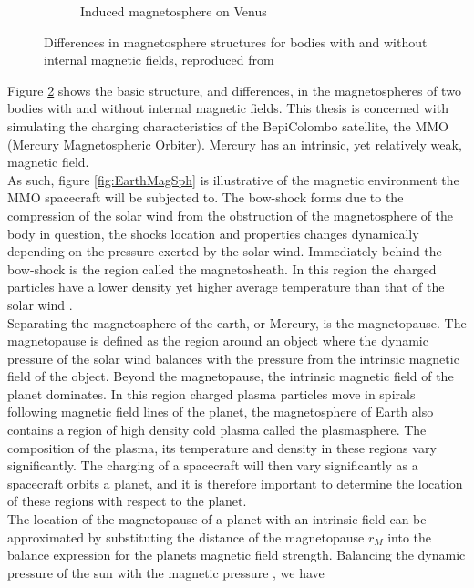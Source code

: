 \begin{figure}
\begin{subfigure}{.5\textwidth}
    \caption{Induced magnetosphere on Venus}
    \label{fig:VenusMagSph}
\end{subfigure}
\caption{Differences in magnetosphere structures for bodies with and without internal magnetic fields, reproduced from }
\label{fig:magnetosphere}
\end{figure}

Figure \ref{fig:magnetosphere} shows the basic structure, and differences, in the magnetospheres of two bodies with and without internal magnetic fields. This thesis is concerned with simulating the charging characteristics of the BepiColombo satellite, the MMO (Mercury Magnetospheric Orbiter). Mercury has an intrinsic, yet relatively weak, magnetic field. 
\\
As such, figure \ref{fig:EarthMagSph} is illustrative of the magnetic environment the MMO spacecraft will be subjected to. The bow-shock forms due to the compression of the solar wind from the obstruction of the magnetosphere of the body in question, the shocks location and properties changes dynamically depending on the pressure exerted by the solar wind. Immediately behind the bow-shock is the region called the magnetosheath. In this region the charged particles have a lower density yet higher average temperature than that of the solar wind \parencite{Benna2009}. 
\\
Separating the magnetosphere of the earth, or Mercury, is the magnetopause. The magnetopause is defined as the region around an object where the dynamic pressure of the solar wind balances with the pressure from the intrinsic magnetic field of the object. Beyond the magnetopause, the intrinsic magnetic field of the planet dominates. In this region charged plasma particles move in spirals following magnetic field lines of the planet, the magnetosphere of Earth also contains a region of high density cold plasma called the plasmasphere. The composition of the plasma, its temperature and density in these regions vary significantly. The charging of a spacecraft will then vary significantly as a spacecraft orbits a planet, and it is therefore important to determine the location of these regions with respect to the planet. 
\\
The location of the magnetopause of a planet with an intrinsic field can be approximated by substituting the distance of the magnetopause $r_M$ into the balance expression for the planets magnetic field strength. Balancing the dynamic pressure of the sun with the magnetic pressure \parencite{Meyer-Vernet2007}, we have

